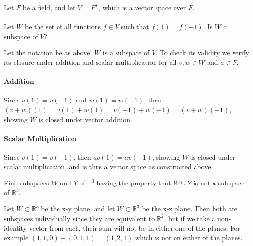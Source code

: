 \documentclass{article}
\begin{document}
\setcounter{problem}{86}
\begin{problem}
Let $F$ be a field, and let $V=F^{F}$, which is a vector space over $F$.

\paragraph{}
Let $W$ be the set of all functions $f\in V$ such that $f(1)=f(-1)$. Is $W$ a subspace of $V$?
\end{problem}

\begin{solution}
Let the notation be as above. $W$ is a subspace of $V$. To check its validity we verify its closure under addition and scalar multiplication for all $v,w \in W$ and $a \in F$.

\paragraph{Addition}
Since $v(1)=v(-1)$ and $w(1)=w(-1)$, then $(v+w)(1)=v(1)+w(1)=v(-1)+w(-1)=(v+w)(-1)$, showing $W$ is closed under vector addition.

\paragraph{Scalar Multiplication}
Since $v(1)=v(-1)$, then $av(1)=av(-1)$, showing $W$ is closed under scalar multiplication, and is thus a vector space as constructed above.
\end{solution}

\setcounter{problem}{103}
\begin{problem}
Find subspaces $W$ and $Y$ of $\mathbb{R}^{3}$ having the property that $W\cup Y$ is not a subspace of $\mathbb{R}^{3}$.
\end{problem}

\begin{solution}
Let $W\subset\mathbb{R}^{3}$ be the x-y plane, and let $W\subset\mathbb{R}^{3}$ be the x-z plane. Then both are subspaces individually since they are equivalent to $\mathbb{R}^{2}$, but if we take a non-identity vector from each, their sum will not be in either one of the planes. For example $(1,1,0) + (0,1,1) = (1,2,1)$ which is not on either of the planes.
\end{solution}
\end{document}
